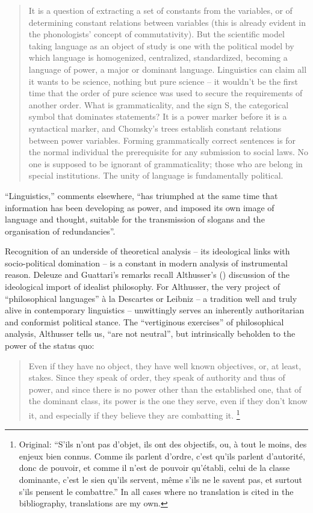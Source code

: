 \documentclass[output=paper]{langscibook}
\begin{document}
\begin{quotation}
It is a question of extracting a set of constants from the variables, or of determining constant relations between variables (this is already evident in the phonologists' concept of commutativity). But the scientific model taking language as an object of study is one with the political model by which language is homogenized, centralized, standardized, becoming a language of power, a major or dominant language. Linguistics can claim all it wants to be science, nothing but pure science -- it wouldn't be the first time that the order of pure science was used to secure the requirements of another order. What is grammaticality, and the sign S, the categorical symbol that dominates statements? It is a power marker before it is a syntactical marker, and Chomsky’s trees establish constant relations between power variables. Forming grammatically correct sentences is for the normal individual the prerequisite for any submission to social laws. No one is supposed to be ignorant of grammaticality; those who are belong in special institutions. The unity of language is fundamentally political. \citep[100--101]{DeleuzeGuattari19871980}
\end{quotation}

``Linguistics,'' \citet[21]{Deleuze1977} comments elsewhere, ``has triumphed at the same time that information has been developing as power, and imposed its own image of language and thought, suitable for the transmission of slogans and the organisation of redundancies''.

Recognition of an underside of theoretical analysis -- its ideological links with socio-political domination -- is a constant in modern analysis of instrumental reason. Deleuze and Guattari's remarks recall Althusser's (\citeyear{Althusser2015}) discussion of the ideological import of idealist philosophy. For Althusser, the very project of ``philosophical languages'' à la Descartes or Leibniz -- a tradition well and truly alive in contemporary linguistics -- unwittingly serves an inherently authoritarian and conformist political stance. The ``vertiginous exercises'' of philosophical analysis, Althusser tells us, ``are not neutral'', but intrinsically beholden to the power of the status quo:

\begin{quotation}
Even if they have no object, they have well known objectives, or, at least, stakes. Since they speak of order, they speak of authority and thus of power, and since there is no power other than the established one, that of the dominant class, its power is the one they serve, even if they don’t know it, and especially if they believe they are combatting it. \citep[107]{Althusser2015}\footnote{Original: ``S'ils n'ont pas d'objet, ils ont des objectifs, ou, à tout le moins, des enjeux bien connus. Comme ils parlent d'ordre, c'est qu'ils parlent d'autorité, donc de pouvoir, et comme il n'est de pouvoir qu'établi, celui de la classe dominante, c'est le sien qu'ils servent, même s'ils ne le savent pas, et surtout s'ils pensent le combattre.'' In all cases where no translation is cited in the bibliography, translations are my own.}
\end{quotation}
\end{document}
